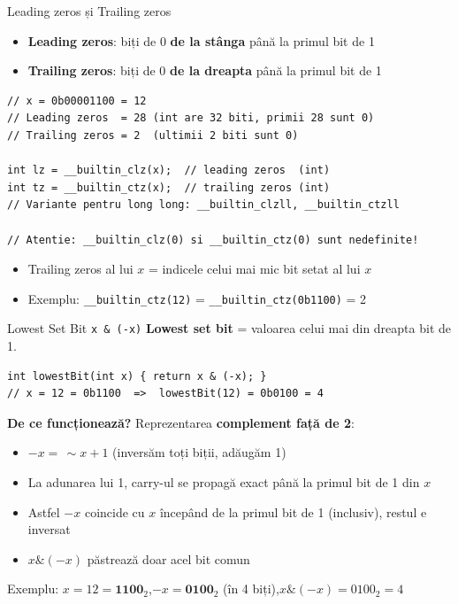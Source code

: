 ﻿\documentclass{beamer}
\begin{document}
\begin{frame}{Leading zeros și Trailing zeros}
  \begin{itemize}
    \item \textbf{Leading zeros}: biți de 0 \textbf{de la stânga} până la primul bit de 1
    \item \textbf{Trailing zeros}: biți de 0 \textbf{de la dreapta} până la primul bit de 1
  \end{itemize}
  \begin{center}
  \begin{lstlisting}
// x = 0b00001100 = 12
// Leading zeros  = 28 (int are 32 biti, primii 28 sunt 0)
// Trailing zeros = 2  (ultimii 2 biti sunt 0)

int lz = __builtin_clz(x);  // leading zeros  (int)
int tz = __builtin_ctz(x);  // trailing zeros (int)
// Variante pentru long long: __builtin_clzll, __builtin_ctzll

// Atentie: __builtin_clz(0) si __builtin_ctz(0) sunt nedefinite!
  \end{lstlisting}
  \end{center}
  \begin{itemize}
    \item Trailing zeros al lui $x$ = indicele celui mai mic bit setat al lui $x$
    \item Exemplu: \lstinline|__builtin_ctz(12)| = \lstinline|__builtin_ctz(0b1100)| = 2
  \end{itemize}
\end{frame}

\begin{frame}{Lowest Set Bit \textemdash{} \lstinline|x & (-x)|}
  \textbf{Lowest set bit} = valoarea celui mai din dreapta bit de 1.

  \begin{center}
  \begin{lstlisting}
int lowestBit(int x) { return x & (-x); }
// x = 12 = 0b1100  =>  lowestBit(12) = 0b0100 = 4
  \end{lstlisting}
  \end{center}
  \medskip
  \textbf{De ce funcționează?} \textemdash{} Reprezentarea \textbf{complement față de 2}:
  \begin{itemize}
    \item $-x = \,\sim\! x + 1$ (inversăm toți biții, adăugăm 1)
    \item La adunarea lui 1, carry-ul se propagă exact până la primul bit de 1 din $x$
    \item Astfel $-x$ coincide cu $x$ începând de la primul bit de 1 (inclusiv), restul e inversat
    \item $x \mathbin{\&} (-x)$ păstrează doar acel bit comun
  \end{itemize}
  \medskip
  Exemplu: $x = 12 = \mathbf{1100}_2$,\quad $-x = \mathbf{0100}_2$ (în 4 biți),\quad $x \mathbin{\&} (-x) = 0100_2 = 4$
\end{frame}
\end{document}
